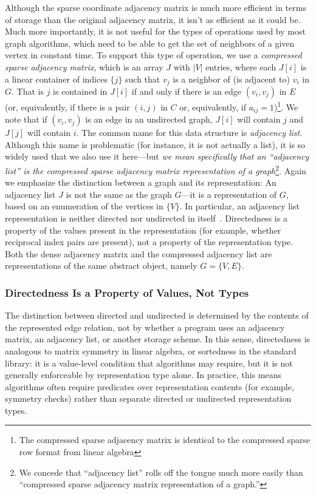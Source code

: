 Although the sparse coordinate adjacency matrix is much more efficient in terms of storage than the original adjacency matrix, it isn't as efficient as it could be.  
Much more importantly, it is not useful for the types of operations used by most graph algorithms, which need to be able to get the set of neighbors of a given vertex in constant time.  
To support this type of operation, we use a \emph{compressed sparse adjacency matrix}, which is an array $J$ with $|V|$ entries, where each $J[i]$ is a linear container of indices $\{ j \}$ such that $v_j$ is a neighbor of (is adjacent to) $v_i$ in $G$.  
That is $j$ is contained in $J[i]$ if and only if there is an edge $(v_i, v_j)$ in $E$ (or, equivalently, if there is a pair $(i, j)$ in $C$ or, equivalently, if $a_{ij} = 1$)\footnote{The compressed sparse adjacency matrix is identical to the compressed sparse row format from linear algebra}.  
We note that if $(v_i, v_j)$ is an edge in an undirected graph, $J[i]$ will contain $j$ and $J[j]$ will contain $i$. 
The common name for this data structure is \emph{adjacency list}.  
Although this name is problematic (for instance, it is not actually a list),  it is so widely used that we also use it here---but \emph{we mean specifically that an  ``adjacency list'' is the compressed sparse adjacency matrix representation of a graph}\footnote{We concede that ``adjacency list'' rolls off the tongue much more easily than ``compressed sparse adjacency matrix representation of a graph.''}.  
Again we emphasize the distinction between a graph and its representation:  An adjacency list $J$ is not the same as the graph $G$---it is a representation of $G$, based on an enumeration of the vertices in $\{V\}$.
In particular, an adjacency list representation is neither directed nor undirected in itself~\cite{CLRS2022}.  Directedness is a property of the values present in the representation (for example, whether reciprocal index pairs are present), not a property of the representation type.
Both the dense adjacency matrix and the compressed adjacency list are representations of the same abstract object, namely $G = \{V, E\}$.

\subsubsection{Directedness Is a Property of Values, Not Types}

The distinction between directed and undirected is determined by the contents of the represented edge relation, not by whether a program uses an adjacency matrix, an adjacency list, or another storage scheme.
In this sense, directedness is analogous to matrix symmetry in linear algebra, or sortedness in the standard library: it is a value-level condition that algorithms may require, but it is not generally enforceable by representation type alone.
In practice, this means algorithms often require predicates over representation contents (for example, symmetry checks) rather than separate directed or undirected representation types.

